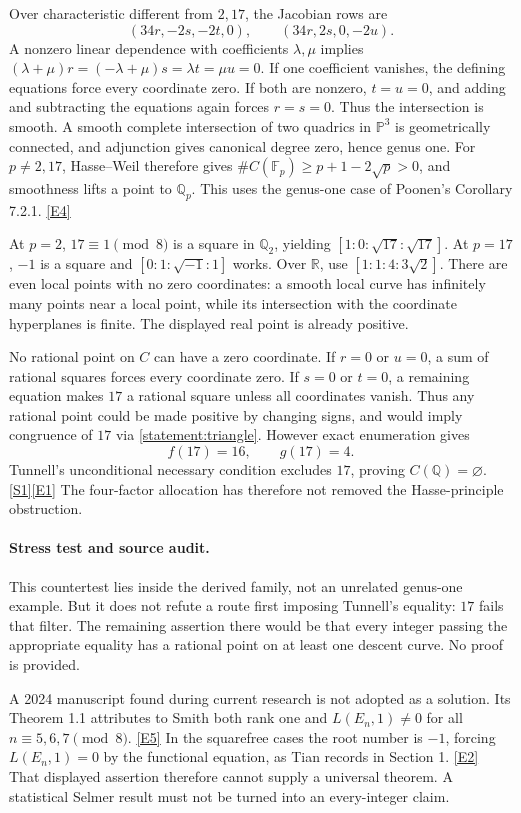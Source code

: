 \documentclass[11pt,a4paper]{article}
\newcommand{\Q}{\mathbb{Q}}
\newcommand{\R}{\mathbb{R}}
\newcommand{\F}{\mathbb{F}}
\newcommand{\PP}{\mathbb P}
\newcommand{\sref}[2]{\hyperlink{source:#1:#2}{[S#2]}}
\newcommand{\eref}[2]{\hyperlink{extra:#1:#2}{[E#2]}}
\numberwithin{equation}{section}
\begin{document}
Over characteristic different from $2,17$, the Jacobian rows are
\[
 (34r,-2s,-2t,0),\qquad(34r,2s,0,-2u).
\]
A nonzero linear dependence with coefficients $\lambda,\mu$ implies
$(\lambda+\mu)r=(-\lambda+\mu)s=\lambda t=\mu u=0$.
If one coefficient vanishes, the defining equations force every coordinate
zero. If both are nonzero, $t=u=0$, and adding and subtracting the equations
again forces $r=s=0$. Thus the intersection is smooth. A smooth complete
intersection of two quadrics in $\PP^3$ is geometrically connected, and
adjunction gives canonical degree zero, hence genus one.
For $p\ne2,17$, Hasse--Weil therefore gives
$\#C(\F_p)\ge p+1-2\sqrt p>0$, and smoothness lifts a point to $\Q_p$.
This uses the genus-one case of Poonen's Corollary 7.2.1. \eref{statement}{4}

At $p=2$, $17\equiv1\pmod8$ is a square in $\Q_2$, yielding
$[1:0:\sqrt{17}:\sqrt{17}]$. At $p=17$, $-1$ is a square and
$[0:1:\sqrt{-1}:1]$ works. Over $\R$, use $[1:1:4:3\sqrt2]$.
There are even local points with no zero coordinates: a smooth local curve
has infinitely many points near a local point, while its intersection with
the coordinate hyperplanes is finite. The displayed real point is already
positive.

No rational point on $C$ can have a zero coordinate. If $r=0$ or $u=0$,
a sum of rational squares forces every coordinate zero. If $s=0$ or $t=0$,
a remaining equation makes $17$ a rational square unless all coordinates
vanish. Thus any rational point could be made positive by changing signs,
and would imply congruence of $17$ via \eqref{statement:triangle}. However exact
enumeration gives
\[
 f(17)=16,\qquad g(17)=4.
\]
Tunnell's unconditional necessary condition excludes $17$, proving
$C(\Q)=\varnothing$. \sref{statement}{1}\eref{statement}{1} The four-factor allocation
has therefore not removed the Hasse-principle obstruction.

\paragraph{Stress test and source audit.}
This countertest lies inside the derived family, not an unrelated genus-one
example. But it does not refute a route first imposing Tunnell's equality:
$17$ fails that filter. The remaining assertion there would be that every
integer passing the appropriate equality has a rational point on at least
one descent curve. No proof is provided.

A 2024 manuscript found during current research is not adopted as a solution.
Its Theorem 1.1 attributes to Smith both rank one and $L(E_n,1)\ne0$ for
all $n\equiv5,6,7\pmod8$. \eref{statement}{5} In the squarefree cases the root
number is $-1$, forcing $L(E_n,1)=0$ by the functional equation, as Tian
records in Section 1. \eref{statement}{2} That displayed assertion therefore
cannot supply a universal theorem. A statistical Selmer result must not be
turned into an every-integer claim.
\end{document}
